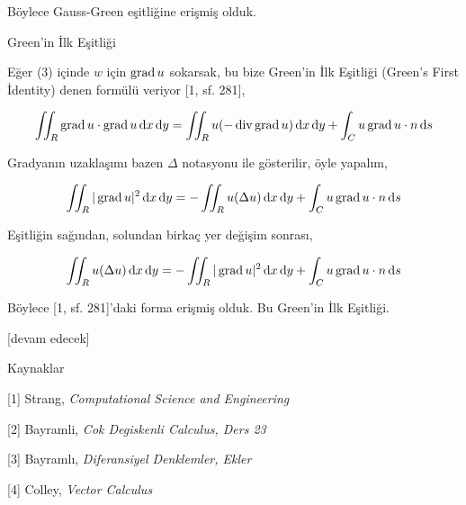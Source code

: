\documentclass[12pt,fleqn]{article}\usepackage{../../common}
\begin{document}
Böylece Gauss-Green eşitliğine erişmiş olduk.

Green'in İlk Eşitliği 

Eğer (3) içinde $w$ için $\operatorname{grad} u$ sokarsak, bu bize Green'in İlk Eşitliği (Green's First
İdentity) denen formülü veriyor [1, sf. 281], 

$$
\iint_R \operatorname{grad} u \cdot \operatorname{grad} u  \,\mathrm{d} x \,\mathrm{d} y =
\iint_R u (-\operatorname{div} \operatorname{grad} u) \,\mathrm{d} x \,\mathrm{d} y + \int_C u \operatorname{grad} u \cdot n \,\mathrm{d} s
$$

Gradyanın uzaklaşımı bazen $\Delta$ notasyonu ile gösterilir, öyle yapalım,

$$
\iint_R | \operatorname{grad} u |^2  \,\mathrm{d} x \,\mathrm{d} y = - \iint_R u (\Delta u) \,\mathrm{d} x \,\mathrm{d} y +
\int_C u \operatorname{grad} u \cdot n \,\mathrm{d} s
$$

Eşitliğin sağından, solundan birkaç yer değişim sonrası,

$$
\iint_R u (\Delta u) \,\mathrm{d} x \,\mathrm{d} y =
- \iint_R | \operatorname{grad} u |^2  \,\mathrm{d} x \,\mathrm{d} y
+ \int_C u \operatorname{grad} u \cdot n \,\mathrm{d} s
$$

Böylece [1, sf. 281]'daki forma erişmiş olduk. Bu Green'in İlk Eşitliği.

[devam edecek]

Kaynaklar

[1] Strang, {\em Computational Science and Engineering}

[2] Bayramli, {\em Cok Degiskenli Calculus, Ders 23}

[3] Bayramlı, {\em Diferansiyel Denklemler, Ekler}

[4] Colley, {\em Vector Calculus}
\end{document}
